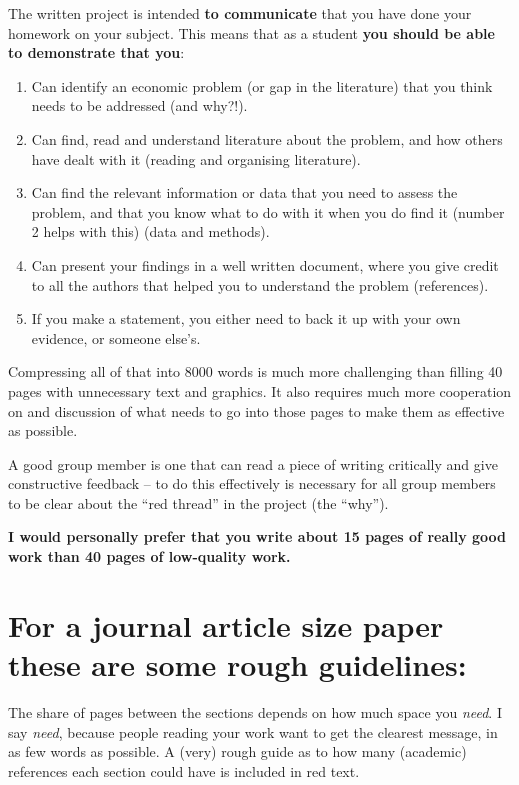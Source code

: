 \documentclass[
]{book}
\begin{document}
The written project is intended \textbf{to communicate} that you have done
your homework on your subject. This means that as a student \textbf{you should
be able to demonstrate that you}:

\begin{enumerate}
\def\labelenumi{\arabic{enumi}.}
\item
  Can identify an economic problem (or gap in the literature) that you
  think needs to be addressed (and why?!).
\item
  Can find, read and understand literature about the problem, and how
  others have dealt with it (reading and organising literature).
\item
  Can find the relevant information or data that you need to assess
  the problem, and that you know what to do with it when you do find
  it (number 2 helps with this) (data and methods).
\item
  Can present your findings in a well written document, where you give
  credit to all the authors that helped you to understand the
  problem (references).
\item
  If you make a statement, you either need to back it up with your own
  evidence, or someone else's.
\end{enumerate}

Compressing all of that into 8000 words is much more challenging than
filling 40 pages with unnecessary text and graphics. It also requires
much more cooperation on and discussion of what needs to go into those
pages to make them as effective as possible.

A good group member is one that can read a piece of writing critically
and give constructive feedback -- to do this effectively is necessary
for all group members to be clear about the ``red thread'' in the project
(the ``why'').

\textbf{I would personally prefer that you write about 15 pages of really good
work than 40 pages of low-quality work.}

\hypertarget{for-a-journal-article-size-paper-these-are-some-rough-guidelines}{%
\section{For a journal article size paper these are some rough guidelines:}\label{for-a-journal-article-size-paper-these-are-some-rough-guidelines}}

The share of pages between the sections depends on how much space you
\emph{need}. I say \emph{need}, because people reading your work want to get the
clearest message, in as few words as possible. A (very) rough guide as
to how many (academic) references each section could have is included in
red text.
\end{document}

